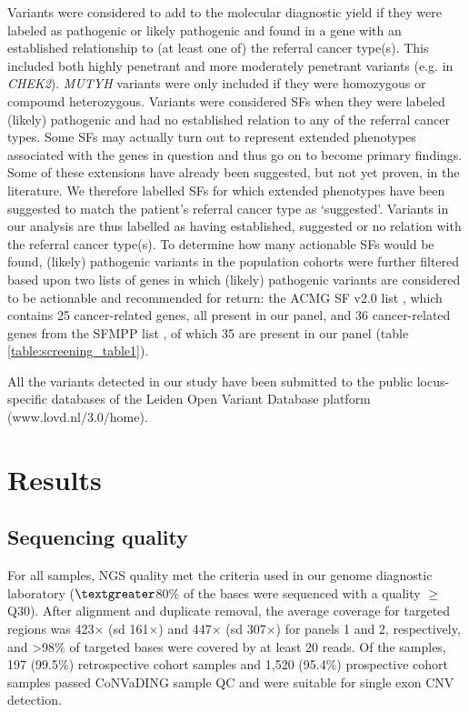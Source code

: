 Variants were considered to add to the molecular diagnostic yield if they were labeled as pathogenic or likely pathogenic and found in a gene with an established relationship to (at least one of) the referral cancer type(s). This included both highly penetrant and more moderately penetrant variants (e.g. in \textsl{CHEK2}). 
\textsl{MUTYH} variants were only included if they were homozygous or compound heterozygous. 
Variants were considered SFs when they were labeled (likely) pathogenic and had no established relation to any of the referral cancer types. 
Some SFs may actually turn out to represent extended phenotypes associated with the genes in question and thus go on to become primary findings. 
Some of these extensions have already been suggested, but not yet proven, in the literature. We therefore labelled SFs for which extended phenotypes have been suggested to match the patient’s referral cancer type as ‘suggested’. 
Variants in our analysis are thus labelled as having established, suggested or no relation with the referral cancer type(s). 
To determine how many actionable SFs would be found, (likely) pathogenic variants in the population cohorts were further filtered based upon two lists of genes in which (likely) pathogenic variants are considered to be actionable and recommended for return: the ACMG SF v2.0 list \cite{Kalia_2016}, which contains 25 cancer-related genes, all present in our panel, and 36 cancer-related genes from the SFMPP list \cite{Pujol_2018}, of which 35 are present in our panel (table \ref{table:screening_table1}).

All the variants detected in our study have been submitted to the public locus-specific databases of the Leiden Open Variant Database platform (www.lovd.nl/3.0/home). 

\section{Results}
\subsection{Sequencing quality}
For all samples, NGS quality met the criteria used in our genome diagnostic laboratory ($\textgreater$80\% of the bases were sequenced with a quality $\ge$Q30). 
After alignment and duplicate removal, the average coverage for targeted regions was 423$\times$ (sd 161$\times$) and 447$\times$ (sd 307$\times$) for panels 1 and 2, respectively, and \textgreater98\% of targeted bases were covered by at least 20 reads. 
Of the samples, 197 (99.5\%) retrospective cohort samples and 1,520 (95.4\%) prospective cohort samples passed CoNVaDING sample QC and were suitable for single exon CNV detection.     

